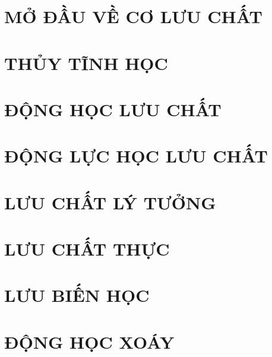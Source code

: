 \documentclass[../main.tex]{subfiles}
\begin{document}
    \chapter{MỞ ĐẦU VỀ CƠ LƯU CHẤT}
        \newpage
        
    \chapter{THỦY TĨNH HỌC}

    \chapter{ĐỘNG HỌC LƯU CHẤT}

    \chapter{ĐỘNG LỰC HỌC LƯU CHẤT}

    \chapter{LƯU CHẤT LÝ TƯỞNG}

    \chapter{LƯU CHẤT THỰC}

    \chapter{LƯU BIẾN HỌC}

    \chapter{ĐỘNG HỌC XOÁY}
\end{document}

